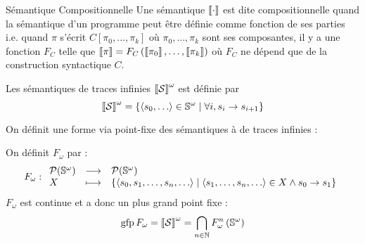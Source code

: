 \documentclass{cours}
\begin{document}
\begin{définition}{Sémantique Compositionnelle}{}
    Une sémantique $\left\llbracket \cdot \right\rrbracket$ est dite compositionnelle quand la sémantique d'un programme peut être définie comme fonction de ses parties i.e. quand $\pi$ s'écrit $C\left[\pi_{0}, \ldots, \pi_{k}\right]$ où $\pi_{0}, \ldots, \pi_{k}$ sont ses composantes, il y a une fonction $F_{C}$ telle que $\left\llbracket \pi \right\rrbracket = F_{C}\left(\left\llbracket \pi_{0} \right\rrbracket, \ldots, \left\llbracket \pi_{k} \right\rrbracket\right)$ où $F_{C}$ ne dépend que de la construction syntactique $C$. 
\end{définition}

\begin{définition}{}{}
    Les sémantiques de traces infinies $\left\llbracket \mathcal{S} \right\rrbracket^{\omega}$ est définie par 
    \[
        \left\llbracket \mathcal{S} \right\rrbracket^{\omega} = \left\{\left\langle s_{0}, \ldots \right\rangle \in \mathbb{S}^{\omega}\mid \forall i, s_{i} \rightarrow s_{i + 1}\right\}
    \]
\end{définition}

On définit une forme via point-fixe des sémantiques à de traces infinies :
\begin{définition}{}{}
    On définit $F_{\omega}$ par : 
    \[
        F_{\omega} : \begin{array}{lcl}
            \mathcal{P}(\mathbb{S}^{\omega}) & \longrightarrow & \mathcal{P}(\mathbb{S}^{\omega})\\
            X & \longmapsto & \left\{\left\langle s_{0}, s_{1}, \ldots, s_{n}, \ldots \right\rangle \mid \left\langle s_{1}, \ldots, s_{n}, \ldots \right\rangle \in X \land s_{0} \to s_{1}\right\}            
        \end{array}
    \]
    $F_{\omega}$ est continue et a donc un plus grand point fixe : 
    \[
        \operatorname{gfp} F_{\omega} = \left\llbracket \mathcal{S} \right\rrbracket^{\omega} = \bigcap_{n \in \mathbb{N}} F_{\omega}^{n}\left(\mathbb{S}^{\omega}\right)
    \]
\end{définition}
\end{document}
